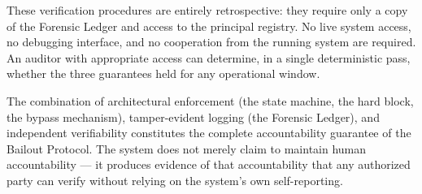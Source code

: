 \bigskip

These verification procedures are entirely retrospective: they require only a copy of the Forensic Ledger and access to the principal registry. No live system access, no debugging interface, and no cooperation from the running system are required. An auditor with appropriate access can determine, in a single deterministic pass, whether the three guarantees held for any operational window.

The combination of architectural enforcement (the state machine, the hard block, the bypass mechanism), tamper-evident logging (the Forensic Ledger), and independent verifiability constitutes the complete accountability guarantee of the Bailout Protocol. The system does not merely claim to maintain human accountability — it produces evidence of that accountability that any authorized party can verify without relying on the system's own self-reporting.